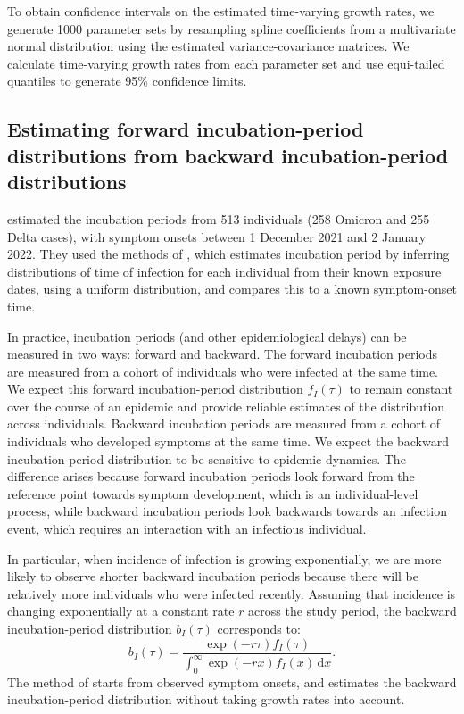 \documentclass[12pt]{article}
\newcommand{\dd}[1]{\ensuremath{\, \mathrm{d}#1}}
\newcommand{\dx}{\dd{x}}
\begin{document}
To obtain confidence intervals on the estimated time-varying growth rates, we generate 1000 parameter sets by resampling spline coefficients from a multivariate normal distribution using the estimated variance-covariance matrices.
We calculate time-varying growth rates from each parameter set and use equi-tailed quantiles to generate 95\% confidence limits. 

\subsection{Estimating forward incubation-period distributions from backward incubation-period distributions}

\cite{backer2021omicron} estimated the incubation periods from 513 individuals (258 Omicron and 255 Delta cases), with symptom onsets between 1 December 2021 and 2 January 2022.
They used the methods of \cite{backer2020incubation}, which estimates incubation period by inferring distributions of time of infection for each individual from their known exposure dates, using a uniform distribution, and compares this to a known symptom-onset time.

In practice, incubation periods (and other epidemiological delays) can be measured in two ways: forward and backward.
The forward incubation periods are measured from a cohort of individuals who were infected at the same time. 
We expect this forward incubation-period distribution $f_I(\tau)$ to remain constant over the course of an epidemic and provide reliable estimates of the distribution across individuals. 
Backward incubation periods are measured from a cohort of individuals who developed symptoms at the same time. 
We expect the backward incubation-period distribution to be sensitive to epidemic dynamics.
The difference arises because forward incubation periods look forward from the reference point towards symptom development, which is an individual-level process, while backward incubation periods look backwards towards an infection event, which requires an interaction with an infectious individual.

In particular, when incidence of infection is growing exponentially, we are more likely to observe shorter backward incubation periods because there will be relatively more individuals who were infected recently.
Assuming that incidence is changing exponentially at a constant rate $r$ across the study period, the backward incubation-period distribution $b_I(\tau)$ corresponds to:
\begin{equation}
b_I(\tau) =\frac{ \exp(-r\tau) f_I(\tau)}{\int_0^\infty \exp(-r x) f_I(x)  \dx}.
\label{eq:backward}
\end{equation}
The method of \cite{backer2020incubation} starts from observed symptom onsets, and estimates the backward incubation-period distribution without taking growth rates into account.
\end{document}
